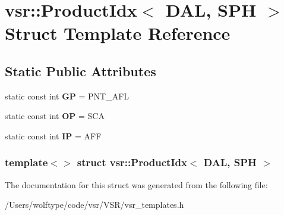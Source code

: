 \hypertarget{structvsr_1_1_product_idx_3_01_d_a_l_00_01_s_p_h_01_4}{\section{vsr\-:\-:Product\-Idx$<$ D\-A\-L, S\-P\-H $>$ Struct Template Reference}
\label{structvsr_1_1_product_idx_3_01_d_a_l_00_01_s_p_h_01_4}
}
\subsection*{Static Public Attributes}
\begin{DoxyCompactItemize}
\item 
\hypertarget{structvsr_1_1_product_idx_3_01_d_a_l_00_01_s_p_h_01_4_a3c1106b7049ea55f612b57626f2e4f57}{static const int {\bfseries G\-P} = P\-N\-T\-\_\-\-A\-F\-L}\label{structvsr_1_1_product_idx_3_01_d_a_l_00_01_s_p_h_01_4_a3c1106b7049ea55f612b57626f2e4f57}

\item 
\hypertarget{structvsr_1_1_product_idx_3_01_d_a_l_00_01_s_p_h_01_4_a04adc9d00d5eb5b86235ff389c1a2c35}{static const int {\bfseries O\-P} = S\-C\-A}\label{structvsr_1_1_product_idx_3_01_d_a_l_00_01_s_p_h_01_4_a04adc9d00d5eb5b86235ff389c1a2c35}

\item 
\hypertarget{structvsr_1_1_product_idx_3_01_d_a_l_00_01_s_p_h_01_4_a18be99c78fc2223af618c956680dcec5}{static const int {\bfseries I\-P} = A\-F\-F}\label{structvsr_1_1_product_idx_3_01_d_a_l_00_01_s_p_h_01_4_a18be99c78fc2223af618c956680dcec5}

\end{DoxyCompactItemize}
\subsubsection*{template$<$$>$ struct vsr\-::\-Product\-Idx$<$ D\-A\-L, S\-P\-H $>$}



The documentation for this struct was generated from the following file\-:\begin{DoxyCompactItemize}
\item 
/\-Users/wolftype/code/vsr/\-V\-S\-R/vsr\-\_\-templates.\-h\end{DoxyCompactItemize}
